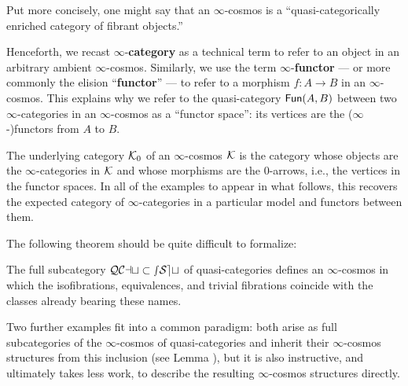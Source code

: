 Put more concisely, one might say that an $\infty$-cosmos is a ``quasi-cat\-e\-go\-ri\-cal\-ly enriched category of fibrant objects.'' %

\begin{con}Henceforth, we recast $\infty$-\textbf{category} as a technical term to refer to an object in an arbitrary ambient $\infty$-cosmos. Similarly, we use the term $\infty$-\textbf{functor} --- or more commonly the elision ``\textbf{functor}'' --- to refer to a morphism $f \colon A \to B$ in an $\infty$-cosmos. This explains why we refer to the quasi-category ${\mathord{\mathsf{Fun}}}(A,B)$ between two $\infty$-categories in an $\infty$-cosmos as a ``functor space'': its vertices are the ($\infty$-)functors from $A$ to $B$.
\end{con}

\begin{rmk} The underlying category ${\mathord{\mathcal{K}}}_0$ of an $\infty$-cosmos ${\mathord{\mathcal{K}}}$ is the category whose objects are the $\infty$-categories in ${\mathord{\mathcal{K}}}$ and whose morphisms are the $0$-arrows, i.e., the vertices in the functor spaces. In all of the examples to appear in what follows, this recovers the expected category of $\infty$-categories in a particular model and functors between them.
\end{rmk}

The following theorem should be quite difficult to formalize:

\begin{prop}\label{prop:qcat-cosmos} The full subcategory ${\mathord{\mathcal{QCat}}}\subset{\mathord{\mathcal{sSet}}}$ of quasi-categories defines an $\infty$-cosmos in which the isofibrations, equivalences, and trivial fibrations coincide with the classes  already bearing these names.
\end{prop}


Two further examples fit into a common paradigm: both arise as full subcategories of the $\infty$-cosmos of quasi-categories and inherit their $\infty$-cosmos structures from this inclusion (see Lemma \cite[6.1.4]{RiehlVerity:2022eo}), but it is also instructive, and ultimately takes less work, to describe the resulting $\infty$-cosmos structures directly.

